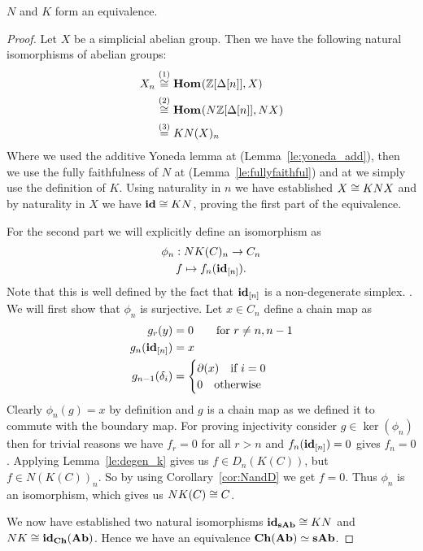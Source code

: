 \begin{theorem}
	$N$ and $K$ form an equivalence.
\end{theorem}
\begin{proof}
	Let $X$ be a simplicial abelian group. Then we have the following natural isomorphisms of abelian groups:
	\begin{align*}
		X_n &\stackrel{(1)}{\cong} \mathbf{Hom}_{}(\mathbb{Z}[\Delta[n]], X) \\
			&\stackrel{(2)}{\cong} \mathbf{Hom}_{}(N\mathbb{Z}[\Delta[n]], NX) \\
			&\stackrel{(3)}{=} KN(X)_n
	\end{align*}
	Where we used the additive Yoneda lemma at  (Lemma~\ref{le:yoneda_add}), then we use the fully faithfulness of $N$ at  (Lemma~\ref{le:fullyfaithful}) and at  we simply use the definition of $K$. Using naturality in $n$ we have established $X \cong KNX$ and by naturality in $X$ we have $\mathbf{id} \cong KN$, proving the first part of the equivalence.

	For the second part we will explicitly define an isomorphism as
	\begin{gather*}
		\phi_n: NK(C)_n \to C_n \\
		f \mapsto f_n(\mathbf{id}_{[n]}).
	\end{gather*}
	Note that this is well defined by the fact that $\mathbf{id}_{[n]}$ is a non-degenerate simplex. . We will first show that $\phi_n$ is surjective. Let $x \in C_n$ define a chain map as
	\begin{align*}
		g_r(y) &= 0 \qquad \text{for } r \neq n, n-1\\
		g_n(\mathbf{id}_{[n]}) &= x \\
		g_{n-1}(\delta_i) &= \begin{cases}
			\partial(x) \quad\text{if } i = 0 \\
			0 \quad\text{otherwise}
		\end{cases} \\
	\end{align*}
	Clearly $\phi_n(g) = x$ by definition and $g$ is a chain map as we defined it to commute with the boundary map. For proving injectivity consider $g \in \ker(\phi_n)$ then for trivial reasons we have $f_r = 0$ for all $r > n$ and $f_n(\mathbf{id}_{[n]}) = 0$ gives $f_n = 0$. Applying Lemma~\ref{le:degen_k} gives us $f \in D_n(K(C))$, but $f \in N(K(C))_n$. So by using Corollary~\ref{cor:NandD} we get $f = 0$. Thus $\phi_n$ is an isomorphism, which gives us $NK(C) \cong C$.

	We now have established two natural isomorphisms $\mathbf{id}_{\mathbf{sAb}} \cong KN$ and $NK \cong \mathbf{id}_\mathbf{Ch}(\mathbf{Ab})$. Hence we have an equivalence $\mathbf{Ch}(\mathbf{Ab}) \simeq \mathbf{sAb}$.
\end{proof}

